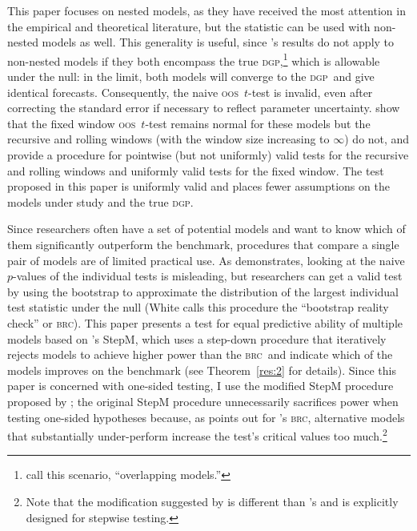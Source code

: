 \documentclass[12pt,fleqn]{article}
\newcommand\citepos[2][]{\citeauthor{#2}'s \citeyearpar[#1]{#2}}
\theoremstyle{definition}
\newcommand{\brc}{\textsc{brc}}
\newcommand{\dgp}{\textsc{dgp}}
\newcommand{\oos}{\textsc{oos}}
\begin{document}
This paper focuses on nested models, as they have received the most
attention in the empirical and theoretical literature, but the
statistic can be used with non-nested models as well.  This generality
is useful, since \citepos{Wes:96} results do not apply to non-nested
models if they both encompass the true \dgp,\footnote{\citet{ClM:11b}
  call this scenario, ``overlapping models.''} which is allowable
under the null: in the limit, both models will converge to the \dgp\
and give identical forecasts.  Consequently, the naive \oos\ $t$-test
is invalid, even after correcting the standard error if necessary to
reflect parameter uncertainty.  \citet{ClM:11b} show that the fixed
window \oos\ $t$-test remains normal for these models but the
recursive and rolling windows (with the window size increasing to
$\infty$) do not, and provide a procedure for pointwise (but not
uniformly) valid tests for the recursive and rolling windows and
uniformly valid tests for the fixed window.  The test proposed in this
paper is uniformly valid and places fewer assumptions on the models
under study and the true \dgp.

Since researchers often have a set of potential models and want to
know which of them significantly outperform the benchmark, procedures
that compare a single pair of models are of limited practical use.  As
\citet{Whi:00} demonstrates, looking at the naive $p$-values of the
individual tests is misleading, but researchers can get a valid test
by using the bootstrap to approximate the distribution of the largest
individual test statistic under the null (White calls this procedure
the ``bootstrap reality check'' or \brc).  This paper presents a test
for equal predictive ability of multiple models based on
\citepos{RoW:05} StepM, which uses a step-down procedure that
iteratively rejects models to achieve higher power than the \brc\ and
indicate which of the models improves on the benchmark (see
Theorem~\ref{res:2} for details).  Since this paper is concerned with
one-sided testing, I use the modified StepM procedure proposed by
\citet{Cal:11e}; the original StepM procedure unnecessarily sacrifices
power when testing one-sided hypotheses because, as \citet{Han:05}
points out for \citepos{Whi:00} \brc, alternative models that
substantially under-perform increase the test's critical values too
much.\footnote{Note that the modification suggested by \citet{Cal:11e}
  is different than \citepos{Han:05} and is explicitly designed for
  stepwise testing.}
\end{document}
